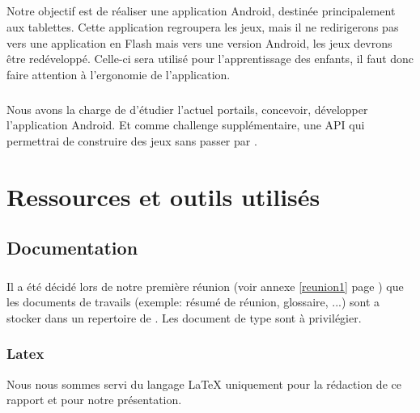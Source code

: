 \documentclass[french]{report}
\begin{document}
\paragraph{}Notre objectif est de réaliser une application Android, destinée principalement aux tablettes. Cette application regroupera les jeux, mais il ne redirigerons pas vers une application en Flash mais vers une version Android, les jeux devrons \^{e}tre redéveloppé. Celle-ci sera utilisé pour l'apprentissage des enfants, il faut donc faire attention à l'ergonomie de l'application.
\paragraph{}Nous avons la charge de d'étudier l'actuel portails, concevoir, développer l'application Android. Et comme challenge supplémentaire, une API qui permettrai de construire des jeux sans passer par \java{}.


\chapter{Ressources et outils utilisés}
\section{Documentation}
\subsection{\googleDrive}
Il a été décidé lors de notre première réunion (voir annexe \ref{reunion1} page \pageref{reunion1}) que les documents de travails (exemple: résumé de réunion, glossaire, ...) sont a stocker dans un repertoire de \googleDrive{}. Les document de type \og{}\google{}\fg{} sont à privilégier.
\subsection{Latex}
Nous nous sommes servi du langage \LaTeX{} uniquement pour la rédaction de ce rapport et pour notre présentation.
\end{document}
